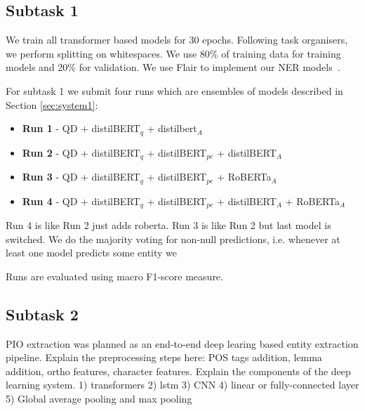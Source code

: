 \documentclass[11pt]{article}
\begin{document}

\subsection{Subtask 1}

We train all transformer based models for 30 epochs. 
Following task organisers, we perform splitting on whitespaces.
We use 80\% of training data for training models and 20\% for validation.
We use Flair to implement our NER models~\cite{Akbik2019FLAIRAE}.

For subtask 1 we submit four runs which are ensembles of models described in Section \ref{sec:system1}:

\begin{itemize}
\item \textbf{Run 1} - QD + distilBERT$_q$ + distilbert$_A$
\item \textbf{Run 2} - QD + distilBERT$_q$ + distilBERT$_{pe}$ + distilBERT$_A$
\item \textbf{Run 3} - QD + distilBERT$_q$ + distilBERT$_{pe}$ + RoBERTa$_A$
\item \textbf{Run 4} - QD + distilBERT$_q$ + distilBERT$_{pe}$ + distilBERT$_A$ + RoBERTa$_A$ 
\end{itemize}

Run 4 is like Run 2 just adds roberta.
Run 3 is like Run 2 but last model is switched.
We do the majority voting for non-null predictions, i.e. whenever at least one model predicts some entity we 

Runs are evaluated using macro F1-score measure.


\subsection{Subtask 2}

PIO extraction was planned as an end-to-end deep learing based entity extraction pipeline.
Explain the preprocessing steps here: POS tags addition, lemma addition, ortho features, character features.
Explain the components of the deep learning system. 1) transformers 2) lstm 3) CNN 4) linear or fully-connected layer 5) Global average pooling and max pooling
\end{document}
